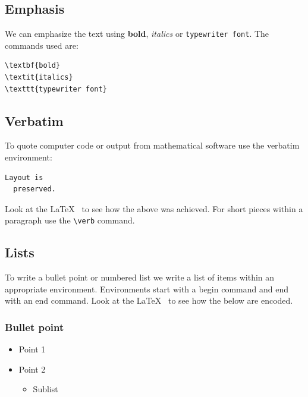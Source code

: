 \documentclass[a4paper,14pt]{extarticle}
\begin{document}
\subsection{Emphasis}

We can emphasize the text using \textbf{bold}, \textit{italics} or \texttt{typewriter font}. The commands used are:
\begin{verbatim}
\textbf{bold}
\textit{italics}
\texttt{typewriter font}
\end{verbatim}

\subsection{Verbatim}

To quote computer code or output from mathematical software use the verbatim environment:
\begin{verbatim}
Layout is 
  preserved.
\end{verbatim}

Look at the \LaTeX~ to see how the above was achieved. For short pieces within a paragraph use the \verb=\verb= command.  

\subsection{Lists}

To write a bullet point or numbered list we write a list of items within an appropriate environment. Environments start with a begin command and end with an end command. Look at the \LaTeX~ to see how the below are encoded.  

\subsubsection{Bullet point}

\begin{itemize}
\item Point 1
\item Point 2
\begin{itemize}
\item Sublist
\end{itemize}
\end{itemize}
\end{document}
